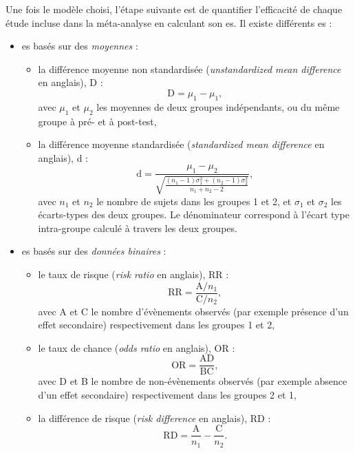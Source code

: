 Une fois le modèle choisi, l'étape suivante est de quantifier l'efficacité de chaque étude incluse dans la méta-analyse en calculant son \gls{es}. 
Il existe différents \gls{es} \citep[Chapitre~3]{Borenstein2009} :
\begin{itemize}
\item \gls{es} basés sur des \emph{moyennes} :
\begin{itemize}
    \item la différence moyenne non standardisée (\textit{unstandardized mean difference} en anglais), D :
		    \begin{equation}
        \label{eq:metareview_unstandardized_mean_difference}
        \text{D} = \mu_{1} - \mu_{1},
        \end{equation} 
		avec $\mu_{1}$ et $\mu_{2}$ les moyennes de deux groupes indépendants, ou du même groupe à pré- et à post-test,
    \item la différence moyenne standardisée (\textit{standardized mean difference} en anglais), d :
		    \begin{equation}
        \label{eq:metareview_standardized_mean_difference}
        \text{d} = \frac{\mu_{1} - \mu_{2}}{\sqrt{\frac{(n_1 - 1)\sigma_1^2 + (n_2 - 1)\sigma_2^2} {n_1 + n_2 - 2}}},
        \end{equation} 
		avec $n_{1}$ et $n_{2}$ le nombre de sujets dans les groupes 1 et 2, et $\sigma_{1}$ et $\sigma_{2}$ les écarts-types des deux groupes. Le dénominateur
		correspond à l'écart type intra-groupe calculé à travers les deux groupes.
\end{itemize}
\item \gls{es} basés sur des \emph{données binaires} :
\begin{itemize}
    \item le taux de risque (\textit{risk ratio} en anglais), RR :
				\begin{equation}
        \label{eq:metareview_risk_ratio}
        \text{RR} = \frac{ \text{A} / n_1 } { \text{C} / n_2 },
        \end{equation} 
		avec A et C le nombre d'évènements observés (par exemple présence d'un effet secondaire) respectivement dans les groupes 1 et 2,
    \item le taux de chance (\textit{odds ratio} en anglais), OR :
				\begin{equation}
        \label{eq:metareview_odds_ratio}
        \text{OR} = \frac{ \text{AD} } { \text{BC} },
        \end{equation} 		
		avec D et B le nombre de non-évènements observés (par exemple absence d'un effet secondaire) respectivement dans les groupes 2 et 1,
		\item la différence de risque (\textit{risk difference} en anglais), RD :
				\begin{equation}
        \label{eq:metareview_risk_difference}
        \text{RD} = \frac{ \text{A} } { n_1 } - \frac{ \text{C} } { n_2 }.
        \end{equation}
\end{itemize}
\end{itemize}

